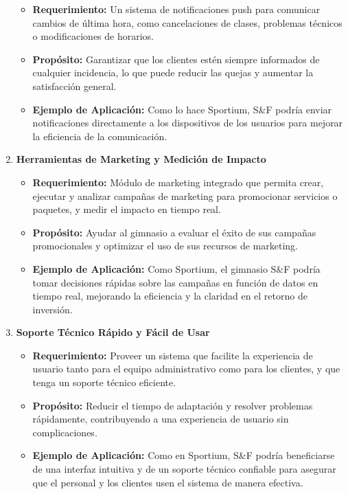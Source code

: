 \begin{enumerate}
    \begin{itemize}
        \item \textbf{Requerimiento:} Un sistema de notificaciones push para comunicar cambios de última hora, como cancelaciones de clases, problemas técnicos o modificaciones de horarios.
        \item \textbf{Propósito:} Garantizar que los clientes estén siempre informados de cualquier incidencia, lo que puede reducir las quejas y aumentar la satisfacción general.
        \item \textbf{Ejemplo de Aplicación:} Como lo hace Sportium, S\&F podría enviar notificaciones directamente a los dispositivos de los usuarios para mejorar la eficiencia de la comunicación.
    \end{itemize}
    \item \textbf{Herramientas de Marketing y Medición de Impacto}
    \begin{itemize}
        \item \textbf{Requerimiento:} Módulo de marketing integrado que permita crear, ejecutar y analizar campañas de marketing para promocionar servicios o paquetes, y medir el impacto en tiempo real.
        \item \textbf{Propósito:} Ayudar al gimnasio a evaluar el éxito de sus campañas promocionales y optimizar el uso de sus recursos de marketing.
        \item \textbf{Ejemplo de Aplicación:} Como Sportium, el gimnasio S\&F podría tomar decisiones rápidas sobre las campañas en función de datos en tiempo real, mejorando la eficiencia y la claridad en el retorno de inversión.
    \end{itemize}
    \item \textbf{Soporte Técnico Rápido y Fácil de Usar}
    \begin{itemize}
        \item \textbf{Requerimiento:} Proveer un sistema que facilite la experiencia de usuario tanto para el equipo administrativo como para los clientes, y que tenga un soporte técnico eficiente.
        \item \textbf{Propósito:} Reducir el tiempo de adaptación y resolver problemas rápidamente, contribuyendo a una experiencia de usuario sin complicaciones.
        \item \textbf{Ejemplo de Aplicación:} Como en Sportium, S\&F podría beneficiarse de una interfaz intuitiva y de un soporte técnico confiable para asegurar que el personal y los clientes usen el sistema de manera efectiva.
    \end{itemize}
\end{enumerate}

